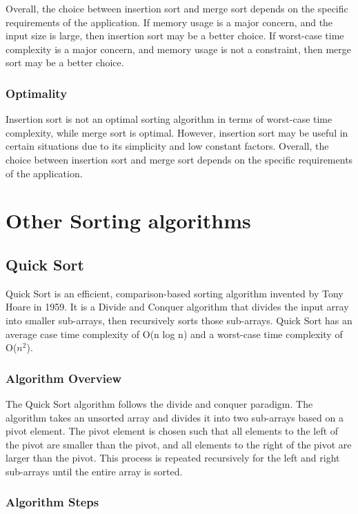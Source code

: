 \documentclass[a4paper, 11pt, oneside]{book} %
\begin{document}
Overall, the choice between insertion sort and merge sort depends on the specific requirements of the application. If memory usage is a major concern, and the input size is large, then insertion sort may be a better choice. If worst-case time complexity is a major concern, and memory usage is not a constraint, then merge sort may be a better choice.
\subsubsection{Optimality}
Insertion sort is not an optimal sorting algorithm in terms of worst-case time complexity, while merge sort is optimal. However, insertion sort may be useful in certain situations due to its simplicity and low constant factors. Overall, the choice between insertion sort and merge sort depends on the specific requirements of the application.


\section{Other Sorting algorithms}
\subsection{Quick Sort}
Quick Sort is an efficient, comparison-based sorting algorithm invented by Tony Hoare in 1959. It is a Divide and Conquer algorithm that divides the input array into smaller sub-arrays, then recursively sorts those sub-arrays. Quick Sort has an average case time complexity of O(n log n) and a worst-case time complexity of O($n^2$).

\subsubsection{Algorithm Overview}
The Quick Sort algorithm follows the divide and conquer paradigm. The algorithm takes an unsorted array and divides it into two sub-arrays based on a pivot element. The pivot element is chosen such that all elements to the left of the pivot are smaller than the pivot, and all elements to the right of the pivot are larger than the pivot. This process is repeated recursively for the left and right sub-arrays until the entire array is sorted.

\subsubsection{Algorithm Steps}
\end{document}
